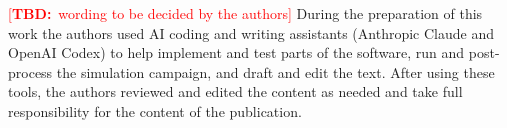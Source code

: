 \documentclass[sn-mathphys,Numbered]{sn-jnl}%
\newcommand{\tbd}[1]{\textcolor{red}{[\textbf{TBD:}~#1]}}
\begin{document}
\tbd{wording to be decided by the authors}
During the preparation of this work the authors used AI coding and writing assistants (Anthropic Claude and OpenAI Codex) to help implement and test parts of the software, run and post-process the simulation campaign, and draft and edit the text.
After using these tools, the authors reviewed and edited the content as needed and take full responsibility for the content of the publication.



\newpage

\begin{appendices}












\end{appendices}


\end{document}
